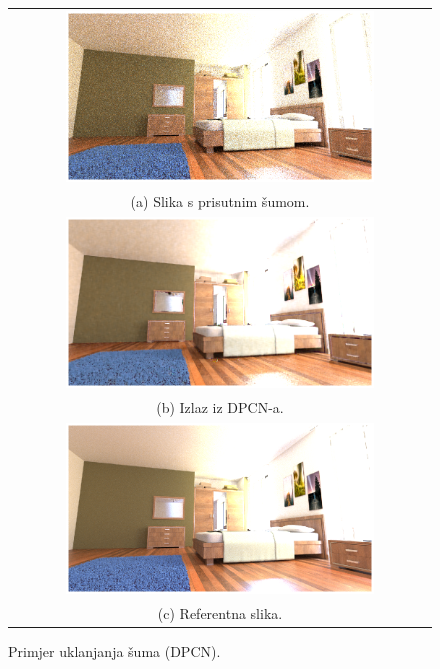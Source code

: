 \documentclass[times, utf8, seminar, numeric]{fer}
\begin{document}
\begin{figure}[H]
  \centering
\begin{tabular}{c}
  \includegraphics[width=0.75\textwidth]{eval4_in.png} \\
  (a) Slika s prisutnim šumom. \\[6pt]
  \includegraphics[width=0.75\textwidth]{eval4_dpcn.png} \\
  (b) Izlaz iz DPCN-a. \\[6pt]
  \includegraphics[width=0.75\textwidth]{eval4_ref.png} \\
  (c) Referentna slika. \\[6pt]
\end{tabular}
\caption{Primjer uklanjanja šuma (DPCN).}
\label{fig:eval4dpcn}
\end{figure}
\end{document}
